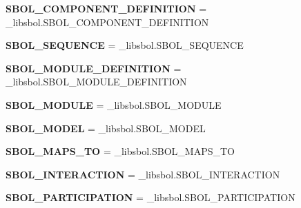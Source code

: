 \begin{DoxyCompactItemize}
\item 
{\bfseries S\+B\+O\+L\+\_\+\+C\+O\+M\+P\+O\+N\+E\+N\+T\+\_\+\+D\+E\+F\+I\+N\+I\+T\+I\+ON} = \+\_\+libsbol.\+S\+B\+O\+L\+\_\+\+C\+O\+M\+P\+O\+N\+E\+N\+T\+\_\+\+D\+E\+F\+I\+N\+I\+T\+I\+ON\hypertarget{namespacesbol_1_1libsbol_aa4f802c9d71494635d8e8ac50d73f767}{}\label{namespacesbol_1_1libsbol_aa4f802c9d71494635d8e8ac50d73f767}

\item 
{\bfseries S\+B\+O\+L\+\_\+\+S\+E\+Q\+U\+E\+N\+CE} = \+\_\+libsbol.\+S\+B\+O\+L\+\_\+\+S\+E\+Q\+U\+E\+N\+CE\hypertarget{namespacesbol_1_1libsbol_aefc0e64d41974da082adf27ee5ceb7df}{}\label{namespacesbol_1_1libsbol_aefc0e64d41974da082adf27ee5ceb7df}

\item 
{\bfseries S\+B\+O\+L\+\_\+\+M\+O\+D\+U\+L\+E\+\_\+\+D\+E\+F\+I\+N\+I\+T\+I\+ON} = \+\_\+libsbol.\+S\+B\+O\+L\+\_\+\+M\+O\+D\+U\+L\+E\+\_\+\+D\+E\+F\+I\+N\+I\+T\+I\+ON\hypertarget{namespacesbol_1_1libsbol_a08475207f3b86b04c70b9edbc907f6a0}{}\label{namespacesbol_1_1libsbol_a08475207f3b86b04c70b9edbc907f6a0}

\item 
{\bfseries S\+B\+O\+L\+\_\+\+M\+O\+D\+U\+LE} = \+\_\+libsbol.\+S\+B\+O\+L\+\_\+\+M\+O\+D\+U\+LE\hypertarget{namespacesbol_1_1libsbol_ad71b3be7d057027b958e3a94ec5e670c}{}\label{namespacesbol_1_1libsbol_ad71b3be7d057027b958e3a94ec5e670c}

\item 
{\bfseries S\+B\+O\+L\+\_\+\+M\+O\+D\+EL} = \+\_\+libsbol.\+S\+B\+O\+L\+\_\+\+M\+O\+D\+EL\hypertarget{namespacesbol_1_1libsbol_a855d5d89c7ac680a4101c1cfc631304c}{}\label{namespacesbol_1_1libsbol_a855d5d89c7ac680a4101c1cfc631304c}

\item 
{\bfseries S\+B\+O\+L\+\_\+\+M\+A\+P\+S\+\_\+\+TO} = \+\_\+libsbol.\+S\+B\+O\+L\+\_\+\+M\+A\+P\+S\+\_\+\+TO\hypertarget{namespacesbol_1_1libsbol_a8722621be75e883d4d2fdf2d03925bcf}{}\label{namespacesbol_1_1libsbol_a8722621be75e883d4d2fdf2d03925bcf}

\item 
{\bfseries S\+B\+O\+L\+\_\+\+I\+N\+T\+E\+R\+A\+C\+T\+I\+ON} = \+\_\+libsbol.\+S\+B\+O\+L\+\_\+\+I\+N\+T\+E\+R\+A\+C\+T\+I\+ON\hypertarget{namespacesbol_1_1libsbol_a8010928dc51415913046be8c98267649}{}\label{namespacesbol_1_1libsbol_a8010928dc51415913046be8c98267649}

\item 
{\bfseries S\+B\+O\+L\+\_\+\+P\+A\+R\+T\+I\+C\+I\+P\+A\+T\+I\+ON} = \+\_\+libsbol.\+S\+B\+O\+L\+\_\+\+P\+A\+R\+T\+I\+C\+I\+P\+A\+T\+I\+ON\hypertarget{namespacesbol_1_1libsbol_a412a0ead6e171bf27e301204fdf4131a}{}\label{namespacesbol_1_1libsbol_a412a0ead6e171bf27e301204fdf4131a}


\end{DoxyCompactItemize}
